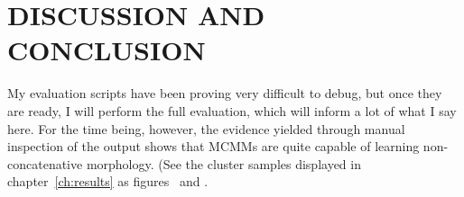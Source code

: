 \chapter{DISCUSSION AND CONCLUSION}

My evaluation scripts have been proving very difficult to debug, but once they are ready, I will perform the full evaluation, which 
will inform a lot of what I say here. For the time being, however, the evidence yielded through manual inspection of the output shows that
MCMMs are quite capable of learning non-concatenative morphology. (See the cluster samples displayed in chapter~\ref{ch:results} as 
figures~\label{fig:cl-fem} and \label{fig:cl-hit}.
